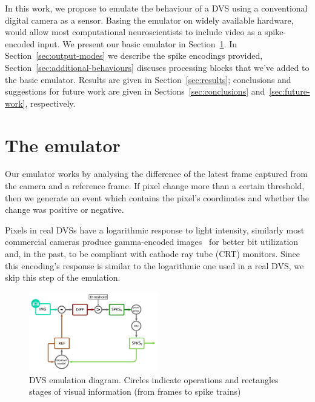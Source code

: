 \documentclass[conference]{IEEEtran}
\begin{document}
In this work, we propose to emulate the behaviour of a DVS using a conventional digital camera as a sensor. Basing the emulator on widely available hardware, would allow most computational neuroscientists to include video as a spike-encoded input. We present our basic emulator in Section~\ref{sec:basic-emulator}. In Section~\ref{sec:output-modes} we describe the spike encodings provided, Section~\ref{sec:additional-behaviours} discuses processing blocks that we've added to the basic emulator. Results are given in Section~\ref{sec:results}; conclusions and suggestions for future work are given in Sections~\ref{sec:conclusions} and~\ref{sec:future-work}, respectively.


\section{The emulator}
\label{sec:basic-emulator}

Our emulator works by analysing the difference of the latest frame captured from the camera and a reference frame. If pixel change more than a certain threshold, then we generate an event which contains the pixel's coordinates and whether the change was positive or negative. 

Pixels in real DVSs have a logarithmic response to light intensity, similarly most commercial cameras produce gamma-encoded images~\cite{PoyntonDigitalVideo} for better bit utilization and, in the past, to be compliant with cathode ray tube (CRT) monitors.
Since this encoding's response is similar to the logarithmic one used in a real DVS, we skip this step of the emulation.

%
\begin{figure}[htb]
  \includegraphics[width=0.5\textwidth]{dvs_emu}
  
  \caption{DVS emulation diagram. Circles indicate operations and rectangles stages of visual information (from frames to spike trains)}
  \label{fig:dvs_emu}
\end{figure}
\end{document}
